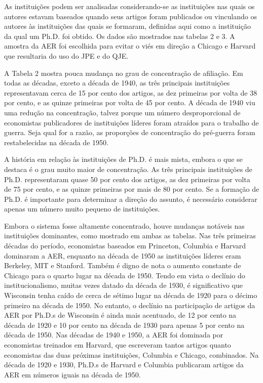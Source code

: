 \documentclass[12pt]{article}
\begin{document}
As instituições podem ser analisadas considerando-se as instituições nas quais os autores estavam baseados quando seus artigos foram publicados ou vinculando os autores às instituições das quais se formaram, definidas aqui como a instituição da qual um Ph.D. foi obtido. Os dados são mostrados nas tabelas 2 e 3. A amostra da AER foi escolhida para evitar o viés em direção a Chicago e Harvard que resultaria do uso do JPE e do QJE.

A Tabela 2 mostra pouca mudança no grau de concentração de afiliação. Em todas as décadas, exceto a década de 1940, as três principais instituições representavam cerca de 15 por cento dos artigos, as dez primeiras por volta de 38 por cento, e as quinze primeiras por volta de 45 por cento. A década de 1940 viu uma redução na concentração, talvez porque um número desproporcional de economistas publicadores de instituições líderes foram atraídos para o trabalho de guerra. Seja qual for a razão, as proporções de concentração do pré-guerra foram restabelecidas na década de 1950.

A história em relação às instituições de Ph.D. é mais mista, embora o que se destaca é o grau muito maior de concentração. As três principais instituições de Ph.D. representaram quase 50 por cento dos artigos, as dez primeiras por volta de 75 por cento, e as quinze primeiras por mais de 80 por cento. Se a formação de Ph.D. é importante para determinar a direção do assunto, é necessário considerar apenas um número muito pequeno de instituições.

Embora o sistema fosse altamente concentrado, houve mudanças notáveis nas instituições dominantes, como mostrado em ambas as tabelas. Nas três primeiras décadas do período, economistas baseados em Princeton, Columbia e Harvard dominaram a AER, enquanto na década de 1950 as instituições líderes eram Berkeley, MIT e Stanford. Também é digno de nota o aumento constante de Chicago para o quarto lugar na década de 1950. Tendo em vista o declínio do institucionalismo, muitas vezes datado da década de 1930, é significativo que Wisconsin tenha caído de cerca de sétimo lugar na década de 1920 para o décimo primeiro na década de 1950. No entanto, o declínio na participação de artigos da AER por Ph.D.s de Wisconsin é ainda mais acentuado, de 12 por cento na década de 1920 e 10 por cento na década de 1930 para apenas 5 por cento na década de 1950. Nas décadas de 1940 e 1950, a AER foi dominada por economistas treinados em Harvard, que escreveram tantos artigos quanto economistas das duas próximas instituições, Columbia e Chicago, combinados. Na década de 1920 e 1930, Ph.D.s de Harvard e Columbia publicaram artigos da AER em números iguais na década de 1950.
\end{document}
